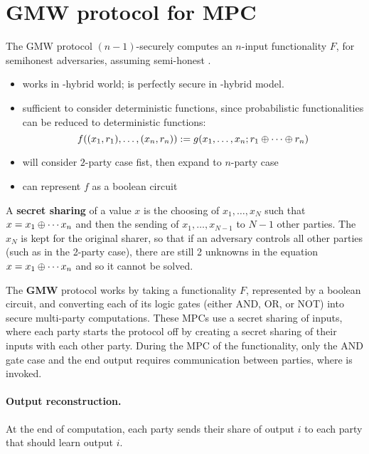 \section{GMW protocol for MPC}

The GMW protocol $(n-1)$-securely computes an $n$-input functionality $F$, for semihonest adversaries, assuming semi-honest \OT.
\begin{itemize}
    \item works in \OT-hybrid world; is perfectly secure in \OT-hybrid model.
    \item sufficient to consider deterministic functions, since probabilistic functionalities can be reduced to deterministic functions:
    \[
        f((x_1, r_1), \dots, (x_n, r_n)) := g(x_1, \dots, x_n; r_1 \oplus \cdots \oplus r_n)
    \]
    \item will consider $2$-party case fist, then expand to $n$-party case
    \item can represent $f$ as a boolean circuit
\end{itemize}

\begin{defn}
A \textbf{secret sharing} of a value $x$ is the choosing of $x_1, \dots, x_N$ such that $x = x_1 \oplus \cdots x_n$ and then the sending of $x_1, \dots, x_{N-1}$ to $N-1$ other parties. The $x_N$ is kept for the original sharer, so that if an adversary controls all other parties (such as in the 2-party case), there are still 2 unknowns in the equation $x = x_1 \oplus \cdots x_n$ and so it cannot be solved.
\end{defn}

\begin{prcl}
The \textbf{GMW} protocol works by taking a functionality $F$, represented by a boolean circuit, and converting each of its logic gates (either AND, OR, or NOT) into secure multi-party computations. These MPCs use a secret sharing of inputs, where each party starts the protocol off by creating a secret sharing of their inputs with each other party. During the MPC of the functionality, only the AND gate case and the end output requires communication between parties, where \OT is invoked. 


\paragraph{Output reconstruction.} At the end of computation, each party sends their share of output $i$ to each party that should learn output $i$.
\end{prcl}

